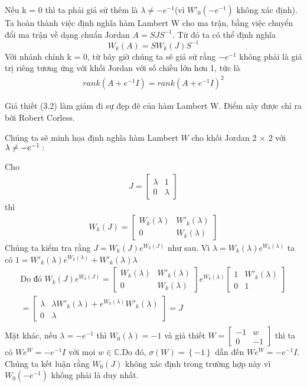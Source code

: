 Nếu k = 0 thì ta phải giả sử thêm là $\lambda \neq -e^{-1}$(vì $W'_{0}(-e^{-1})$ không xác định). \\
Ta hoàn thành việc định nghĩa hàm Lambert W cho ma trận, bằng việc chuyển đổi ma trận về dạng chuẩn Jordan $A = SJS^{-1}$. Từ đó ta có thể định nghĩa
$$ W_k(A) = S W_k(J) S^{-1} $$
Với nhánh chính k = 0, từ bây giờ chúng ta sẽ giả sử rằng $-e^{-1}$ không phải là giá trị riêng tương ứng với khối Jordan với số chiều lớn hơn 1, tức là
\begin{align} rank (A + e^{-1}I) = rank (A + e^{-1}I)^{2} \end{align}
\begin{note} 
Giả thiết (3.2) làm giảm đi sự đẹp đẽ của hàm Lambert W. Điểm này được chỉ ra bởi Robert Corless.
\end{note}
\begin{vd}
Chúng ta sẽ minh họa định nghĩa hàm Lambert $W$ cho khối Jordan 2 $\times$ 2 với $\lambda \neq -e^{-1} : \\ $ 
\end{vd}
Cho
\begin{align*}
 J = \begin{bmatrix} 
\lambda & 1 \\
0 & \lambda
 \end{bmatrix} 
\end{align*}
thì 
\begin{align*}
 W_k(J) = \begin{bmatrix} 
W_k(\lambda) & W'_k(\lambda) \\
0 & W_k(\lambda) \end{bmatrix} 
\end{align*}
Chúng ta kiểm tra rằng $J = W_k(J)e^{W_k(J)}$ như sau. Vì $\lambda = W_k(\lambda)e^{W_k(\lambda)}$ ta có $1 = W'_k(\lambda)e^{W_k(\lambda )} + W'_k(\lambda)\lambda$
\begin{align*}
\mbox{Do đó } W_k(J)e^{W_k(J)} = \begin{bmatrix} 
W_k(\lambda) & W'_k(\lambda) \\
0 & W_k(\lambda) 
\end{bmatrix}
e^{W_k(\lambda)} \begin{bmatrix} 
1 & W'_k(\lambda) \\
0 & 1 
\end{bmatrix} \\
= \begin{bmatrix} 
\lambda & \lambda W'_k(\lambda) + e^{W_k(\lambda)} W'_k(\lambda)\\
0 & \lambda 
\end{bmatrix} 
 = J \\
\end{align*}
Mặt khác, nếu $\lambda = -e^{-1}$ thì $W_0(\lambda) = -1$ và giả thiết $W = \begin{bmatrix} 
-1 & w \\
0 & -1
\end{bmatrix}$ thì ta có $We^{W} = -e^{-1}I \mbox{ với mọi }  w \in \mathbb{C}$.Do đó, $\sigma(W) =  \left\{-1\right\}$ dẫn đến $We^{W} = -e^{-1}I$. Chúng ta kết luận rằng $W_0(J)$ không xác định trong trường hợp này vì $W_0(-e^{-1})$ không phải là duy nhất.
